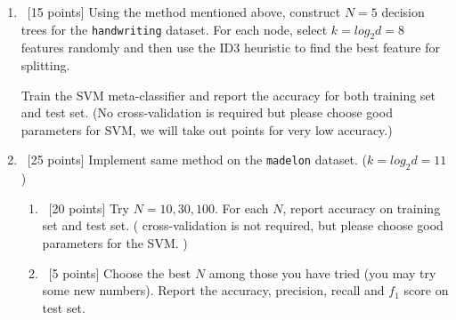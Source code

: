 \begin{enumerate}
\item ~[15 points] Using the method mentioned above, construct
  $N = 5$ decision trees for the {\tt handwriting} dataset. For each
  node, select $k = log_2 d = 8$ features randomly and then use the
  ID3 heuristic to find the best feature for splitting.

  Train the SVM meta-classifier and report the accuracy for both
  training set and test set. (No cross-validation is required but
  please choose good parameters for SVM, we will take out points for
  very low accuracy.)

\item ~[25 points] Implement same method on the {\tt madelon}
  dataset. ($k = log_2 d = 11$)
  \begin{enumerate}
  \item ~[20 points] Try $N = 10, 30, 100$. For each $N$, report
    accuracy on training set and test set. ( cross-validation is not
   required, but please choose good parameters for the SVM. )

  \item ~[5 points] Choose the best $N$ among those you have tried
    (you may try some new numbers). Report the accuracy, precision,
    recall and $f_1$ score on test set.
  \end{enumerate}
\end{enumerate}

